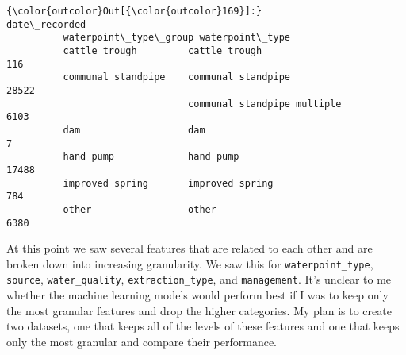 \documentclass[11pt]{article}
\begin{document}
\begin{Verbatim}[commandchars=\\\{\}]
{\color{outcolor}Out[{\color{outcolor}169}]:}                                                    date\_recorded
          waterpoint\_type\_group waterpoint\_type                           
          cattle trough         cattle trough                          116
          communal standpipe    communal standpipe                   28522
                                communal standpipe multiple           6103
          dam                   dam                                      7
          hand pump             hand pump                            17488
          improved spring       improved spring                        784
          other                 other                                 6380
\end{Verbatim}
            
    At this point we saw several features that are related to each other and
are broken down into increasing granularity. We saw this for
\texttt{waterpoint\_type}, \texttt{source}, \texttt{water\_quality},
\texttt{extraction\_type}, and \texttt{management}. It's unclear to me
whether the machine learning models would perform best if I was to keep
only the most granular features and drop the higher categories. My plan
is to create two datasets, one that keeps all of the levels of these
features and one that keeps only the most granular and compare their
performance.


    
    
    
    
\end{document}
